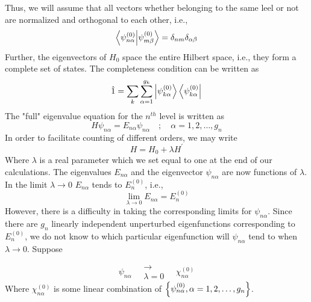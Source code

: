 	Thus, we will assume that all vectors whether belonging to the same leel or not are normalized and orthogonal to each other, i.e.,
	\begin{equation}
		\braket{\psi^{(0)}_{n\alpha}}{\psi^{(0)}_{m\beta}} = \delta_{n m}\delta_{\alpha \beta}
		\label{chapter20.eqn5-degenerate} 
	\end{equation}
	Further, the eigenvectors of $H_0$ space the entire Hilbert space, i.e., they form a complete set of states. The completeness condition can be written as
	\begin{equation}
		\hat{1} = \sum_{k} \sum_{\alpha = 1}^{g_k} \ket{\psi^{(0)}_{k\alpha}} \bra{\psi^{(0)}_{k\alpha}}
		\label{chapter20.eqn6-degenerate} 
	\end{equation}
	The "full" eigenvalue equation for the $n^{th}$ level is written as
	\begin{equation}
		H \psi_{n \alpha} = E_{n \alpha} \psi_{n \alpha} \quad ; \quad \alpha = 1,2,\ldots,g_n
		\label{chapter20.eqn7-degenerate} 
	\end{equation}
	In order to facilitate counting of different orders, we may write
	\begin{equation}
		H = H_0 + \lambda H^\prime
	\end{equation}
	Where $\lambda$ is a real parameter which we set equal to one at the end of our calculations.
	The eigenvalues $E_{n \alpha}$ and the eigenvector $\psi_{n\alpha}$ are now functions of $\lambda$. In the limit $\lambda \rightarrow 0$ $E_{n\alpha}$ tends to $E_n^{(0)}$, i.e.,
	\begin{equation}
		\lim\limits_{\lambda \rightarrow 0} E_{n\alpha} = E_n^{(0)}
		\label{chapter20.eqn8-degenerate} 
	\end{equation}
	However, there is a difficulty in taking the corresponding limits for $\psi_{n\alpha}$. Since there are $g_n$ linearly independent unperturbed eigenfunctions corresponding to $E_n^{(0)}$, we do not know to which particular eigenfunction will $\psi_{n\alpha}$ tend to when $\lambda \rightarrow 0$. Suppose
	
	\begin{equation}
		\psi_{n\alpha} \quad \substack{\rightarrow \\ \lambda=0} \quad \chi_{n\alpha}^{(0)}
	\end{equation}
	Where $\chi_{n\alpha}^{(0)}$ is some linear combination of $\qty{\psi_{n \alpha}^{(0)}, \alpha=1,2,\ldots,g_n}$.
	
